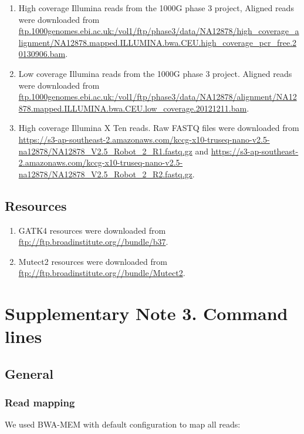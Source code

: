 \documentclass{article}
\begin{document}
\begin{enumerate}
    \item High coverage Illumina reads from the 1000G phase 3 project, Aligned reads were downloaded from \url{ftp.1000genomes.ebi.ac.uk:/vol1/ftp/phase3/data/NA12878/high_coverage_alignment/NA12878.mapped.ILLUMINA.bwa.CEU.high_coverage_pcr_free.20130906.bam}.
    \item Low coverage Illumina reads from the 1000G phase 3 project. Aligned reads were downloaded from \url{ftp.1000genomes.ebi.ac.uk:/vol1/ftp/phase3/data/NA12878/alignment/NA12878.mapped.ILLUMINA.bwa.CEU.low_coverage.20121211.bam}.
    \item High coverage Illumina X Ten reads. Raw FASTQ files were downloaded from \url{https://s3-ap-southeast-2.amazonaws.com/kccg-x10-truseq-nano-v2.5-na12878/NA12878_V2.5_Robot_2_R1.fastq.gz} and \url{https://s3-ap-southeast-2.amazonaws.com/kccg-x10-truseq-nano-v2.5-na12878/NA12878_V2.5_Robot_2_R2.fastq.gz}.
\end{enumerate}

\subsection*{Resources}

\begin{enumerate}
    \item GATK4 resources were downloaded from \url{ftp://ftp.broadinstitute.org//bundle/b37}.
    \item Mutect2 resources were downloaded from \url{ftp://ftp.broadinstitute.org//bundle/Mutect2}.
\end{enumerate}

\newpage

\section*{Supplementary Note 3. Command lines}

\subsection*{General}

\subsubsection*{Read mapping}

\noindent We used BWA-MEM with default configuration to map all reads:
\end{document}
